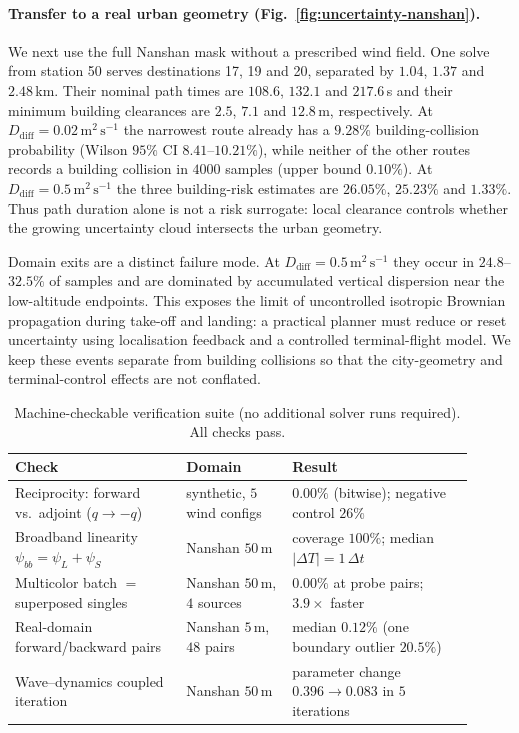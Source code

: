 \paragraph{Transfer to a real urban geometry
(Fig.~\ref{fig:uncertainty-nanshan}).}
We next use the full Nanshan mask without a prescribed wind field. One
solve from station 50 serves destinations 17, 19 and 20, separated by
$1.04$, $1.37$ and $2.48\,$km. Their nominal path times are $108.6$,
$132.1$ and $217.6\,$s and their minimum building clearances are
$2.5$, $7.1$ and $12.8\,$m, respectively. At
$D_{\mathrm{diff}}=0.02\,\mathrm{m^2\,s^{-1}}$ the narrowest route
already has a $9.28\%$ building-collision probability (Wilson $95\%$
CI $8.41$--$10.21\%$), while neither of the other routes records a
building collision in $4000$ samples (upper bound $0.10\%$). At
$D_{\mathrm{diff}}=0.5\,\mathrm{m^2\,s^{-1}}$ the three building-risk
estimates are $26.05\%$, $25.23\%$ and $1.33\%$. Thus path duration
alone is not a risk surrogate: local clearance controls whether the
growing uncertainty cloud intersects the urban geometry.

Domain exits are a distinct failure mode. At
$D_{\mathrm{diff}}=0.5\,\mathrm{m^2\,s^{-1}}$ they occur in $24.8$--
$32.5\%$ of samples and are dominated by accumulated vertical
dispersion near the low-altitude endpoints. This exposes the limit of
uncontrolled isotropic Brownian propagation during take-off and
landing: a practical planner must reduce or reset uncertainty using
localisation feedback and a controlled terminal-flight model. We keep
these events separate from building collisions so that the city-geometry
and terminal-control effects are not conflated.

\begin{table}[t]
\centering
\caption{Machine-checkable verification suite (no additional solver
runs required). All checks pass.}
\label{tab:verification}
\small
\begin{tabular}{p{0.34\linewidth}p{0.21\linewidth}p{0.36\linewidth}}
\toprule
Check & Domain & Result \\
\midrule
Reciprocity: forward vs.\ adjoint ($q\to-q$) & synthetic, $5$ wind configs & $0.00\%$ (bitwise); negative control $26\%$ \\
Broadband linearity $\psi_{bb}=\psi_L+\psi_S$ & Nanshan $50\,$m & coverage $100\%$; median $|\Delta T| = 1\,\Delta t$ \\
Multicolor batch $=$ superposed singles & Nanshan $50\,$m, $4$ sources & $0.00\%$ at probe pairs; $3.9\times$ faster \\
Real-domain forward/backward pairs & Nanshan $5\,$m, $48$ pairs & median $0.12\%$ (one boundary outlier $20.5\%$)\footnotemark \\
Wave--dynamics coupled iteration & Nanshan $50\,$m & parameter change $0.396 \to 0.083$ in $5$ iterations \\
\bottomrule
\end{tabular}
\end{table}

